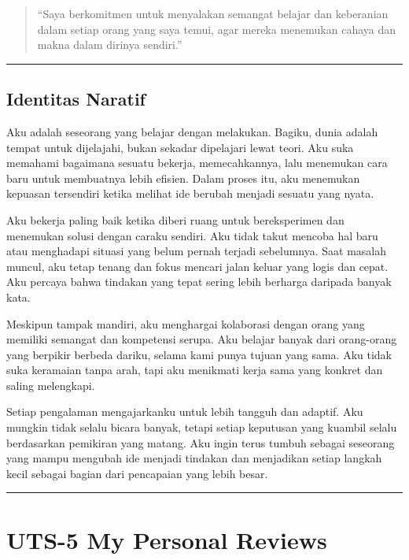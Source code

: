 \documentclass[
  letterpaper,
  DIV=11,
  numbers=noendperiod]{scrreprt}
\begin{document}
\begin{quote}
``Saya berkomitmen untuk menyalakan semangat belajar dan keberanian
dalam setiap orang yang saya temui, agar mereka menemukan cahaya dan
makna dalam dirinya sendiri.''
\end{quote}

\begin{center}\rule{0.5\linewidth}{0.5pt}\end{center}

\section{Identitas Naratif}\label{identitas-naratif}

Aku adalah seseorang yang belajar dengan melakukan. Bagiku, dunia adalah
tempat untuk dijelajahi, bukan sekadar dipelajari lewat teori. Aku suka
memahami bagaimana sesuatu bekerja, memecahkannya, lalu menemukan cara
baru untuk membuatnya lebih efisien. Dalam proses itu, aku menemukan
kepuasan tersendiri ketika melihat ide berubah menjadi sesuatu yang
nyata.

Aku bekerja paling baik ketika diberi ruang untuk bereksperimen dan
menemukan solusi dengan caraku sendiri. Aku tidak takut mencoba hal baru
atau menghadapi situasi yang belum pernah terjadi sebelumnya. Saat
masalah muncul, aku tetap tenang dan fokus mencari jalan keluar yang
logis dan cepat. Aku percaya bahwa tindakan yang tepat sering lebih
berharga daripada banyak kata.

Meskipun tampak mandiri, aku menghargai kolaborasi dengan orang yang
memiliki semangat dan kompetensi serupa. Aku belajar banyak dari
orang-orang yang berpikir berbeda dariku, selama kami punya tujuan yang
sama. Aku tidak suka keramaian tanpa arah, tapi aku menikmati kerja sama
yang konkret dan saling melengkapi.

Setiap pengalaman mengajarkanku untuk lebih tangguh dan adaptif. Aku
mungkin tidak selalu bicara banyak, tetapi setiap keputusan yang kuambil
selalu berdasarkan pemikiran yang matang. Aku ingin terus tumbuh sebagai
seseorang yang mampu mengubah ide menjadi tindakan dan menjadikan setiap
langkah kecil sebagai bagian dari pencapaian yang lebih besar.

\begin{center}\rule{0.5\linewidth}{0.5pt}\end{center}


\chapter{UTS-5 My Personal Reviews}\label{uts-5-my-personal-reviews}
\end{document}
